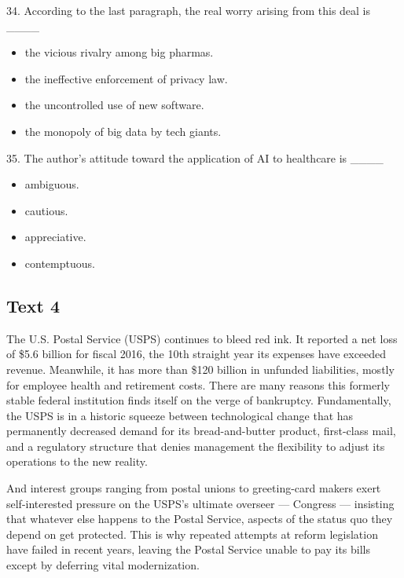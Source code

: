 \documentclass[UTF8,11pt]{ctexart}
\begin{document}
34. According to the last paragraph, the real worry arising from this deal is \_\_\_\_


\begin{itemize}[leftmargin=2em,itemsep=.2em,topsep=.4em]\item[A.] the vicious rivalry among big pharmas.
\item[B.] the ineffective enforcement of privacy law.
\item[C.] the uncontrolled use of new software.
\item[D.] the monopoly of big data by tech giants.
\end{itemize}

35. The author’s attitude toward the application of AI to healthcare is \_\_\_\_


\begin{itemize}[leftmargin=2em,itemsep=.2em,topsep=.4em]\item[A.] ambiguous.
\item[B.] cautious.
\item[C.] appreciative.
\item[D.] contemptuous.
\end{itemize}

\subsection*{\textbf{Text 4}}


The U.S. Postal Service (USPS) continues to bleed red ink. It reported a net loss of \$5.6 billion for fiscal 2016, the 10th straight year its expenses have exceeded revenue. Meanwhile, it has more than \$120 billion in unfunded liabilities, mostly for employee health and retirement costs. There are many reasons this formerly stable federal institution finds itself on the verge of bankruptcy. Fundamentally, the USPS is in a historic squeeze between technological change that has permanently decreased demand for its bread-and-butter product, first-class mail, and a regulatory structure that denies management the flexibility to adjust its operations to the new reality.


And interest groups ranging from postal unions to greeting-card makers exert self-interested pressure on the USPS’s ultimate overseer — Congress — insisting that whatever else happens to the Postal Service, aspects of the status quo they depend on get protected. This is why repeated attempts at reform legislation have failed in recent years, leaving the Postal Service unable to pay its bills except by deferring vital modernization.
\end{document}

